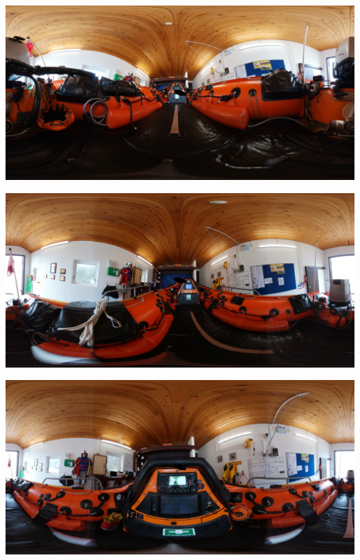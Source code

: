 \documentclass[ %
                    author={Elis Jones},
                supervisor={Dr. Kirsten Cater},
                    degree={BSc},
                     title={The Effect of Presentation Medium on Spatial Cognition},
                  subtitle={in the Virtual Environment},
                      year={2018} ]{dissertation}
\begin{document}
\begin{minipage}{\textwidth}
\begin{center}
\begin{minipage}{0.3\textwidth}
    \end{minipage}\hfill
\end{center}
\begin{center}
    \centering
    \begin{minipage}{0.3\textwidth}
        \centering
        \includegraphics[width=1\textwidth]{images/360-items/propeller.JPG}
    \end{minipage}\hfill
    \begin{minipage}{0.3\textwidth}
        \centering
        \includegraphics[width=1\textwidth]{images/360-items/towrope.JPG}
    \end{minipage}\hfill
    \begin{minipage}{0.3\textwidth}
        \centering
        \includegraphics[width=1\textwidth]{images/360-items/vhf.JPG}
    \end{minipage}\hfill
\end{center}
\label{360-items}
\end{minipage}
\end{document}
